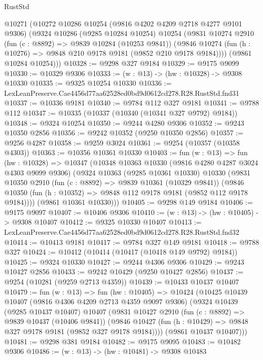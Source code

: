 \begin{lexlean}{RustStd}
\begin{coremodule}
  @10271
    (@10272
      @10286
      @10254
      (@9816 @4202 @4209 @2718 @4277 @9101 @9306)
      (@9324
        @10286
        (@9285 @10284 @10254)
        @10254
        (@9831
          @10274
          @2910
          (fun (c : @8892) => @9839 @10284 (@10253 @9841))
          (@9846 @10274 (fun (h : @10276) => @9848 @210 @9178 @9181 (@9852 @210 @9178 @9184))))
        (@9861 @10284 @10254)))
@10328 := @9298 @327 @9184
@10329 := @9175 @9099
@10330 := @10329 @9306
@10333 := (w : @13) -> (hw : @10328) -> @9308 @10330
@10335 := @9325 @10254 @10330
@10336 := LexLeanPreserve.Cae4456d77aa62528ed0bd9d0612cd278.R28.RustStd.fnd31
@10337 := @10336 @9181
@10340 := @9784 @112 @327 @9181
@10341 := @9788 @112
@10347 := @10335 (@10337 (@10340 (@10341 @327 @9792) @9184))
@10348 := @9324 @10254
@10350 := @9244 @4280 @9306
@10352 := @9243 @10350 @2856
@10356 := @9242 @10352 (@9250 @10350 @2856)
@10357 := @9256 @4287
@10358 := @9259 @3024
@10361 := @9254 (@10357 (@10358 @4303))
@10363 := @10356 @10361 @10330
@10403 := fun (w : @13) =>
  fun (hw : @10328) =>
  @10347
    (@10348
      @10363
      @10330
      (@9816 @4280 @4287 @3024 @4303 @9099 @9306)
      (@9324
        @10363
        (@9285 @10361 @10330)
        @10330
        (@9831
          @10350
          @2910
          (fun (c : @8892) => @9839 @10361 (@10329 @9841))
          (@9846 @10350 (fun (h : @10352) => @9848 @112 @9178 @9181 (@9852 @112 @9178 @9184))))
        (@9861 @10361 @10330)))
@10405 := @9298 @149 @9184
@10406 := @9175 @9097
@10407 := @10406 @9306
@10410 := (w : @13) -> (hw : @10405) -> @9308 @10407
@10412 := @9325 @10330 @10407
@10413 := LexLeanPreserve.Cae4456d77aa62528ed0bd9d0612cd278.R28.RustStd.fnd32
@10414 := @10413 @9181
@10417 := @9784 @327 @149 @9181
@10418 := @9788 @327
@10424 := @10412 (@10414 (@10417 (@10418 @149 @9792) @9184))
@10425 := @9324 @10330
@10427 := @9244 @4306 @9306
@10429 := @9243 @10427 @2856
@10433 := @9242 @10429 (@9250 @10427 @2856)
@10437 := @9254 (@10281 (@9259 @2713 @4359))
@10439 := @10433 @10437 @10407
@10479 := fun (w : @13) =>
  fun (hw : @10405) =>
  @10424
    (@10425
      @10439
      @10407
      (@9816 @4306 @4209 @2713 @4359 @9097 @9306)
      (@9324
        @10439
        (@9285 @10437 @10407)
        @10407
        (@9831
          @10427
          @2910
          (fun (c : @8892) => @9839 @10437 (@10406 @9841))
          (@9846 @10427 (fun (h : @10429) => @9848 @327 @9178 @9181 (@9852 @327 @9178 @9184))))
        (@9861 @10437 @10407)))
@10481 := @9298 @381 @9184
@10482 := @9175 @9095
@10483 := @10482 @9306
@10486 := (w : @13) -> (hw : @10481) -> @9308 @10483

\end{coremodule}
\end{lexlean}
